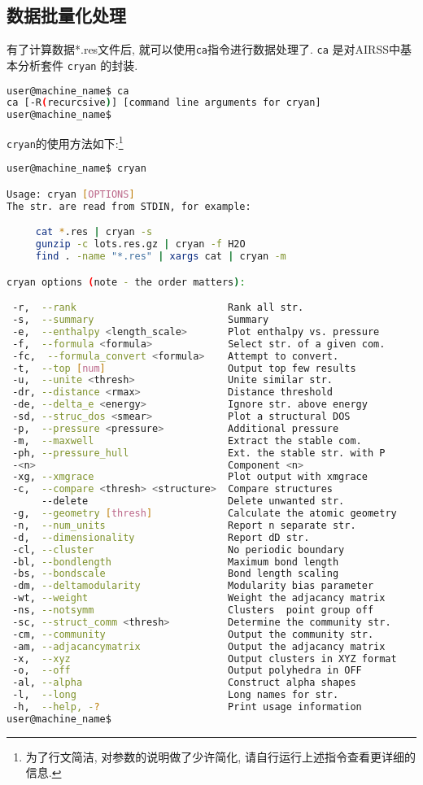 \documentclass[a4paper, 10pt]{article}
\begin{document}
\subsection{数据批量化处理}
有了计算数据*.res文件后, 就可以使用\verb|ca|指令进行数据处理了. \verb|ca| 是对AIRSS中基本分析套件 \verb|cryan| 的封装. 
\begin{lstlisting}[language={bash}]
user@machine_name$ ca
ca [-R(recurcsive)] [command line arguments for cryan]
user@machine_name$
\end{lstlisting}

\verb|cryan|的使用方法如下:\footnote{为了行文简洁, 对参数的说明做了少许简化, 请自行运行上述指令查看更详细的信息.}
\begin{lstlisting}[language={bash}]
user@machine_name$ cryan

Usage: cryan [OPTIONS]
The str. are read from STDIN, for example:

     cat *.res | cryan -s
     gunzip -c lots.res.gz | cryan -f H2O
     find . -name "*.res" | xargs cat | cryan -m

cryan options (note - the order matters):

 -r,  --rank                          Rank all str.
 -s,  --summary                       Summary
 -e,  --enthalpy <length_scale>       Plot enthalpy vs. pressure
 -f,  --formula <formula>             Select str. of a given com.
 -fc,  --formula_convert <formula>    Attempt to convert.
 -t,  --top [num]                     Output top few results
 -u,  --unite <thresh>                Unite similar str.
 -dr, --distance <rmax>               Distance threshold
 -de, --delta_e <energy>              Ignore str. above energy
 -sd, --struc_dos <smear>             Plot a structural DOS
 -p,  --pressure <pressure>           Additional pressure
 -m,  --maxwell                       Extract the stable com.
 -ph, --pressure_hull                 Ext. the stable str. with P
 -<n>                                 Component <n>
 -xg, --xmgrace                       Plot output with xmgrace
 -c,  --compare <thresh> <structure>  Compare structures
      --delete                        Delete unwanted str.
 -g,  --geometry [thresh]             Calculate the atomic geometry
 -n,  --num_units                     Report n separate str.
 -d,  --dimensionality                Report dD str.
 -cl, --cluster                       No periodic boundary
 -bl, --bondlength                    Maximum bond length
 -bs, --bondscale                     Bond length scaling
 -dm, --deltamodularity               Modularity bias parameter
 -wt, --weight                        Weight the adjacancy matrix
 -ns, --notsymm                       Clusters  point group off
 -sc, --struct_comm <thresh>          Determine the community str.
 -cm, --community                     Output the community str.
 -am, --adjacancymatrix               Output the adjacancy matrix
 -x,  --xyz                           Output clusters in XYZ format
 -o,  --off                           Output polyhedra in OFF
 -al, --alpha                         Construct alpha shapes
 -l,  --long                          Long names for str.
 -h,  --help, -?                      Print usage information
user@machine_name$
\end{lstlisting}
\end{document}
